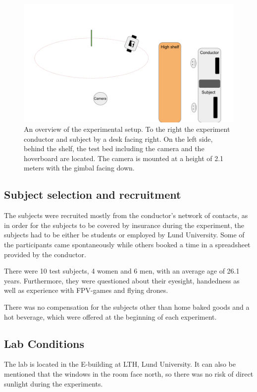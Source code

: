 \documentclass[nofilelist]{cslthse-msc}
\begin{document}
\begin{figure}[!hbt]
   \centering
   \includegraphics[scale=0.5]{images/exp-setup.png} 
   \caption{An overview of the experimental setup. To the right the experiment conductor and subject by a desk facing right. On the left side, behind the shelf, the test bed including the camera and the hoverboard are located. The camera is mounted at a height of 2.1 meters with the gimbal facing down.}
   \label{fig:exp-setup}
\end{figure}

\subsection{Subject selection and recruitment}
The subjects were recruited mostly from the conductor's network of contacts, as in order for the subjects to be covered by insurance during the experiment, the subjects had to be either be students or employed by Lund University. Some of the participants came spontaneously while others booked a time in a spreadsheet provided by the conductor.

There were 10 test subjects, 4 women and 6 men, with an average age of 26.1 years. Furthermore, they were questioned about their eyesight, handedness as well as experience with FPV-games and flying drones.

There was no compensation for the subjects other than home baked goods and a hot beverage, which were offered at the beginning of each experiment. 

\subsection{Lab Conditions}
The lab is located in the E-building at LTH, Lund University. It can also be mentioned that the windows in the room face north, so there was no risk of direct sunlight during the experiments.
\end{document}
